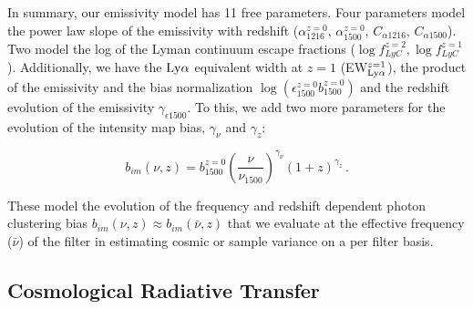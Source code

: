 \documentclass[fleqn,usenatbib]{mnras}
\begin{document}
In summary, our emissivity model has 11 free parameters. Four parameters model the power law slope of the emissivity with redshift ($\alpha_{1216}^{z=0}$, $\alpha_{1500}^{z=0}$, $C_{\alpha 1216}$, $C_{\alpha 1500}$). Two model the log of the Lyman continuum escape fractions ($\log{f_{LyC}^{z=2}}, \log{f_{LyC}^{z=1}}$). Additionally, we have the ${\rm Ly\alpha}$ equivalent width at $z=1$ (EW$_{\rm Ly\alpha}^{z=1}$), the product of the emissivity and the bias normalization $\log{(\epsilon_{1500}^{z=0} b_{1500}^{z=0})}$ and the redshift evolution of the emissivity $\gamma_{\epsilon 1500}$. To this, we add two more parameters for the evolution of the intensity map bias, $\gamma_{\nu}$ and $\gamma_{z}$: 

\begin{equation}
    \label{photon_bias} 
    b_{im}(\nu, z) = b_{1500}^{z=0} \left(\frac{\nu}{\nu_{1500}}\right)^{\gamma_\nu} (1+z)^{\gamma_z}\,.
\end{equation}

These model the evolution of the frequency and redshift dependent photon clustering bias $b_{im}(\nu, z) \approx b_{im}(\bar{\nu}, z)$ that we evaluate at the effective frequency ($\bar{\nu}$) of the filter in estimating cosmic or sample variance on a per filter basis. 


\subsection{Cosmological Radiative Transfer}
\label{sec:CRT}
\end{document}
